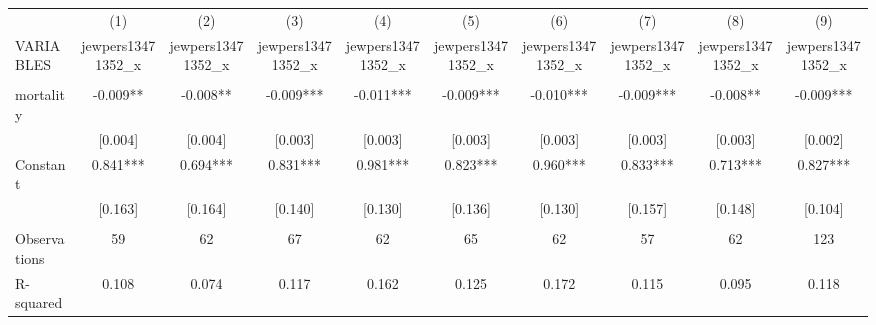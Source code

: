 \documentclass[landscape]{article}
\begin{document}
\begin{tabular}{lccccccccc} \hline
 & (1) & (2) & (3) & (4) & (5) & (6) & (7) & (8) & (9) \\
VARIABLES & jewpers13471352\_x & jewpers13471352\_x & jewpers13471352\_x & jewpers13471352\_x & jewpers13471352\_x & jewpers13471352\_x & jewpers13471352\_x & jewpers13471352\_x & jewpers13471352\_x \\ \hline
 &  &  &  &  &  &  &  &  &  \\
mortality & -0.009** & -0.008** & -0.009*** & -0.011*** & -0.009*** & -0.010*** & -0.009*** & -0.008** & -0.009*** \\
 & [0.004] & [0.004] & [0.003] & [0.003] & [0.003] & [0.003] & [0.003] & [0.003] & [0.002] \\
Constant & 0.841*** & 0.694*** & 0.831*** & 0.981*** & 0.823*** & 0.960*** & 0.833*** & 0.713*** & 0.827*** \\
 & [0.163] & [0.164] & [0.140] & [0.130] & [0.136] & [0.130] & [0.157] & [0.148] & [0.104] \\
 &  &  &  &  &  &  &  &  &  \\
Observations & 59 & 62 & 67 & 62 & 65 & 62 & 57 & 62 & 123 \\
 R-squared & 0.108 & 0.074 & 0.117 & 0.162 & 0.125 & 0.172 & 0.115 & 0.095 & 0.118 \\ \hline
\end{tabular}
\end{document}
